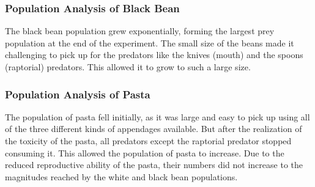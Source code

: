 \documentclass{scrartcl}
\begin{document}
\subsubsection{Population Analysis of Black Bean}
\begin{center}
\end{center}

The black bean population grew exponentially, forming the largest prey population at the end of the experiment. The small size of the beans made it challenging to pick up for the predators like the knives (mouth) and the spoons (raptorial) predators. This allowed it to grow to such a large size.


\subsubsection{Population Analysis of Pasta}
\begin{center}
\end{center}

The population of pasta fell initially, as it was large and easy to pick up using all of the three different kinds of appendages available. But after the realization of the toxicity of the pasta, all predators except the raptorial predator stopped consuming it. This allowed the population of pasta to increase. Due to the reduced reproductive ability of the pasta, their numbers did not increase to the magnitudes reached by the white and black bean populations.
\end{document}

